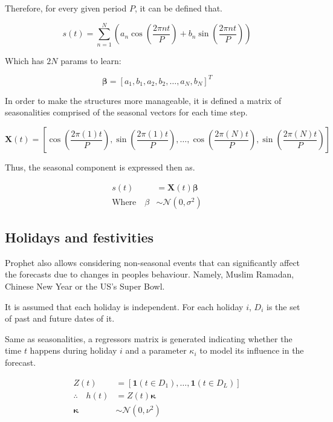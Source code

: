 Therefore, for every given period $P$, it can be defined that.

\begin{equation}
	s(t) = \sum_{n=1}^{N}\left( a_n \cos\left( \frac{2 \pi n t}{P}\right)  + b_n \sin\left( \frac{2 \pi n t}{P}\right) \right)
\end{equation}

Which has $2N$ params to learn:

\begin{equation*}
	\bm{\beta} = \left[ a_1, b_1, a_2, b_2, \ldots, a_N, b_N\right]^T
\end{equation*}

In order to make the structures more manageable, it is defined a matrix of seasonalities comprised of the seasonal vectors for each time step.

\begin{equation}
	\bm{X}(t) = \left[ \cos\left( \frac{2 \pi (1) t}{P}\right), \sin\left( \frac{2 \pi (1) t}{P}\right), \dots , \cos\left( \frac{2 \pi (N) t}{P}\right), \sin\left( \frac{2 \pi (N) t}{P}\right)  \right]
\end{equation}

Thus, the seasonal component is expressed then as.

\begin{align}
	s(t) &= \bm{X}(t) \bm{\beta} \\
	\text{Where} \quad \beta &\sim \mathcal{N}(0, \sigma^2)
\end{align}


\subsection{Holidays and festivities}

Prophet also allows considering non-seasonal events that can significantly affect the forecasts due to changes in peoples behaviour. Namely, Muslim Ramadan, Chinese New Year or the US's Super Bowl.

It is assumed that each holiday is independent. For each holiday $i$, $D_i$ is the set of past and future dates of it. 

Same as seasonalities, a regressors matrix is generated indicating whether the time $t$ happens during holiday $i$ and a parameter $\kappa_i$ to model its influence in the forecast.

\begin{align}
	Z(t) &=  \left[   \bm{1}(t \in D_1), \ldots, \bm{1}(t \in D_L) \right] \\
	\therefore \quad h(t) &= Z(t)\bm{\kappa} \\
	\bm{\kappa} &\sim \mathcal{N}(0,\nu^2)
\end{align}

